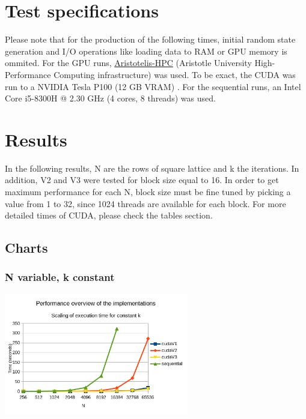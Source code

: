\documentclass[11pt]{article}
\begin{document}
\section{Test specifications}
\label{sec:org8c7a99a}
Please note that for the production of the following times, initial random state generation and I/O operations like loading data to RAM or GPU memory is ommited. For the GPU runs, \href{https://hpc.it.auth.gr/}{Aristotelis-HPC} (Aristotle University High-Performance Computing infrastructure) was used. To be exact, the CUDA was run to a NVIDIA Tesla P100 (12 GB VRAM) \autocite{hpc-resources}. For the sequential runs, an Intel Core i5-8300H @ 2.30 GHz (4 cores, 8 threads) was used.
\section{Results}
\label{sec:org8ef3c86}
In the following results, N are the rows of square lattice and k the iterations. In addition, V2 and V3 were tested for block size equal to 16. In order to get maximum performance for each N, block size must be fine tuned by picking a value from 1 to 32, since 1024 threads are available for each block. For more detailed times of CUDA, please check the tables section.
\pagebreak
\subsection{Charts}
\label{sec:org5d2f33f}
\subsubsection{N variable, k constant}
\label{sec:orgd05e883}
\begin{center}
\includegraphics[height=200]{./images/performance-overview.png}
\end{center}
\end{document}
